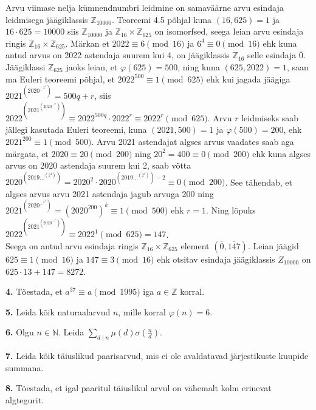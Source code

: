 \documentclass[a4paper, 10pt]{article}
\newcommand{\Z}{\mathbb{Z}}
\newcommand{\N}{\mathbb{N}}
\newcommand{\w}{\overline}
\begin{document}
\bigskip
Arvu viimase nelja kümnendnumbri leidmine on samaväärne arvu esindaja leidmisega jäägiklassis $\Z_{10000}$. Teoreemi 4.5 põhjal kuna $(16,625)=1$ ja $16\cdot625=10000$ siis $\Z_{10000}$ ja $\Z_{16}\times \Z_{625}$ on isomorfsed, seega leian arvu esindaja ringis $\Z_{16}\times \Z_{625}$. Märkan et $2022\equiv6\pmod{16}$ ja $6^4\equiv0\pmod{16}$ ehk kuna antud arvus on 2022 astendaja suurem kui 4, on jäägiklassis $\Z_{16}$ selle esindaja $\w0$.\\
Jäägiklassi $\Z_{625}$ jaoks leian, et $\varphi(625)=500$, ning kuna $(625,2022)=1$, saan ma Euleri teoreemi põhjal, et $2022^{500}\equiv1\pmod{625}$ ehk kui jagada jäägiga $2021^{(2020^{\ldots^{2^1}})}= 500q+r$, siis $2022^{(2021^{(2020^{\ldots^{2^1}})})}\equiv2022^{500q}\cdot2022^r\equiv2022^r\pmod{625}$. Arvu $r$ leidmiseks saab jällegi kasutada Euleri teoreemi, kuna $(2021,500)=1$ ja $\varphi(500)=200$, ehk $2021^{200}\equiv1\pmod{500}$. Arvu 2021 astendajat algses arvus vaadates saab aga märgata, et $2020\equiv20\pmod {200}$ ning $20^2=400\equiv0\pmod{200}$ ehk kuna algses arvus on 2020 astendaja suurem kui 2, saab võtta $2020^{(2019\dots^{(2^1)})}=2020^2\cdot2020^{(2019\dots^{(2^1)})-2}\equiv0\pmod{200}$. See tähendab, et algses arvus arvu 2021 astendaja jagub arvuga 200 ning $2021^{(2020^{\ldots^{2^1}})}=(2020^200)^k\equiv1\pmod{500}$ ehk $r=1$. Ning lõpuks $2022^{(2021^{(2020^{\ldots^{2^1}})})}\equiv2022^1\pmod {625}=147$.\\
Seega on antud arvu esindaja ringis $\Z_{16}\times\Z_{625}$ element $(\w0,\w{147})$. Leian jäägid $625\equiv1\pmod{16}$ ja $147\equiv3\pmod{16}$ ehk otsitav esindaja jäägiklassis $Z_{10000}$ on $625\cdot13+147=8272$.
\bigskip

\noindent \textbf{4.} Tõestada, et \mbox{$a^{37}\equiv a\pmod{1995}$} iga $a\in\Z$ korral.  

\bigskip

\noindent \textbf{5.} Leida kõik naturaalarvud $n$, mille korral $\varphi(n)=6$. 

\bigskip

\noindent \textbf{6.} Olgu $n\in\N$. Leida $\sum\limits_{d\mid n}\mu(d)\sigma(\frac{n}{d})$. 

\bigskip

\noindent \textbf{7.} Leida kõik täiuslikud paarisarvud, mis ei ole avaldatavad järjestikuste kuupide summana. 

\bigskip

\noindent \textbf{8.} Tõestada, et igal paaritul täiuslikul arvul on vähemalt kolm erinevat algtegurit. 
\end{document}
